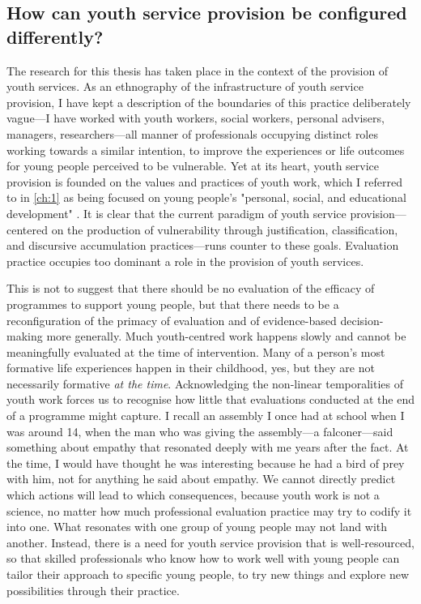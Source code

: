 \subsection{How can youth service provision be configured differently?}
The research for this thesis has taken place in the context of the provision of youth services. As an ethnography of the infrastructure of youth service provision, I have kept a description of the boundaries of this practice deliberately vague—I have worked with youth workers, social workers, personal advisers, managers, researchers—all manner of professionals occupying distinct roles working towards a similar intention, to improve the experiences or life outcomes for young people perceived to be vulnerable. Yet at its heart, youth service provision is founded on the values and practices of youth work, which I referred to in \ref{ch:1} as being focused on young people's "personal, social, and educational development" \citep[p. 110]{ord_young_2022}. It is clear that the current paradigm of youth service provision— centered on the production of vulnerability through justification, classification, and discursive accumulation practices—runs counter to these goals. Evaluation practice occupies too dominant a role in the provision of youth services.

This is not to suggest that there should be no evaluation of the efficacy of programmes to support young people, but that there needs to be a reconfiguration of the primacy of evaluation and of evidence-based decision-making more generally. Much youth-centred work happens slowly and cannot be meaningfully evaluated at the time of intervention. Many of a person's most formative life experiences happen in their childhood, yes, but they are not necessarily formative \textit{at the time}. Acknowledging the non-linear temporalities of youth work forces us to recognise how little that evaluations conducted at the end of a programme might capture. I recall an assembly I once had at school when I was around 14, when the man who was giving the assembly—a falconer—said something about empathy that resonated deeply with me years after the fact. At the time, I would have thought he was interesting because he had a bird of prey with him, not for anything he said about empathy. We cannot directly predict which actions will lead to which consequences, because youth work is not a science, no matter how much professional evaluation practice may try to codify it into one. What resonates with one group of young people may not land with another. Instead, there is a need for youth service provision that is well-resourced, so that skilled professionals who know how to work well with young people can tailor their approach to specific young people, to try new things and explore new possibilities through their practice.

